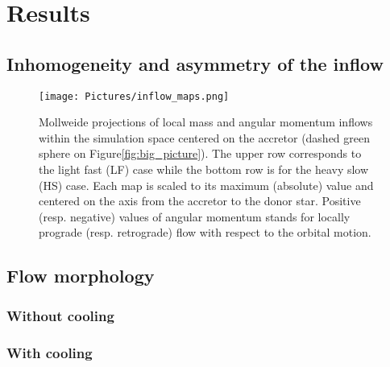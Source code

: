 \documentclass[a4paper,fleqn,usenatbib]{article}
\begin{document}
\section{Results}
\label{sec:res}

\subsection{Inhomogeneity and asymmetry of the inflow}
\label{sec:asymm}

\begin{figure*}
\centering
\texttt{[image: Pictures/inflow\_maps.png]}
\caption{Mollweide projections of local mass and angular momentum inflows within the simulation space centered on the accretor (dashed green sphere on Figure\ref{fig:big_picture}). The upper row corresponds to the light fast (LF) case while the bottom row is for the heavy slow (HS) case. Each map is scaled to its maximum (absolute) value and centered on the axis from the accretor to the donor star. Positive (resp. negative) values of angular momentum stands for locally prograde (resp. retrograde) flow with respect to the orbital motion.}
\label{fig:inflow_maps}
\end{figure*} 

\subsection{Flow morphology}
\label{sec:morph}

\subsubsection{Without cooling}
\label{sec:cool_F}

\subsubsection{With cooling}
\label{sec:cool_T}
\end{document}
